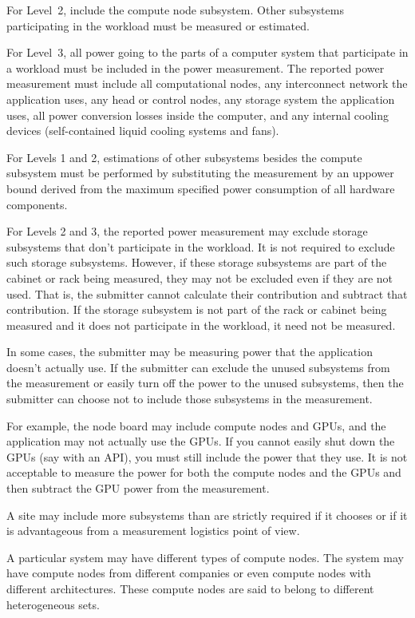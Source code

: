 \noindent
For Level~2, include the compute node subsystem.
Other subsystems participating in the workload must be measured or estimated.
\wl

\noindent
For Level~3, all power going to the parts of a computer system that participate in a workload must be included in the power measurement.
The reported power measurement must include all computational nodes, any interconnect network the application uses, any head or control nodes, any storage system the application uses, all power conversion losses inside the computer, and any internal cooling devices (self-contained liquid cooling systems and fans).
\wl

\noindent
For Levels 1 and 2, estimations of other subsystems besides the compute subsystem must be performed by substituting the measurement by an uppower bound derived from the maximum specified power consumption of all hardware components.
\wl

\noindent
For Levels 2 and 3, the reported power measurement may exclude storage subsystems that don't participate in the workload.
It is not required to exclude such storage subsystems.
However, if these storage subsystems are part of the cabinet or rack being measured, they may not be excluded even if they are not used.
That is, the submitter cannot calculate their contribution and subtract that contribution.
If the storage subsystem is not part of the rack or cabinet being measured and it does not participate in the workload, it need not be measured.
\wl

\noindent
In some cases, the submitter may be measuring power that the application doesn't actually use.
If the submitter can exclude the unused subsystems from the measurement or easily turn off the power to the unused subsystems, then the submitter can choose not to include those subsystems in the measurement.
\wl

\noindent
For example, the node board may include compute nodes and GPUs, and the application may not actually use the GPUs.
If you cannot easily shut down the GPUs (say with an API), you must still include the power that they use.
It is not acceptable to measure the power for both the compute nodes and the GPUs and then subtract the GPU power from the measurement.
\wl

\noindent
A site may include more subsystems than are strictly required if it chooses or if it is advantageous from a measurement logistics point of view.
\wl

\noindent
A particular system may have different types of compute nodes.
The system may have compute nodes from different companies or even compute nodes with different architectures.
These compute nodes are said to belong to different heterogeneous sets.
\wl

